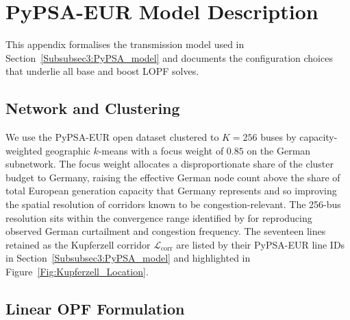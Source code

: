 \section{PyPSA-EUR Model Description}\label{Appendix:PyPSA_Model}
 
This appendix formalises the transmission model used in Section~\ref{Subsubsec3:PyPSA_model} and documents the configuration choices that underlie all base and boost LOPF solves.
 
\subsection{Network and Clustering}
 
We use the PyPSA-EUR open dataset \citep{Brown_2018_PyPSA_Eur, Frysztacki_2020_Modeling_Curtailment_Germany, Frysztacki_2021_Network_Resolution_VRE} clustered to $K = 256$ buses by capacity-weighted geographic $k$-means with a focus weight of $0.85$ on the German subnetwork. The focus weight allocates a disproportionate share of the cluster budget to Germany, raising the effective German node count above the share of total European generation capacity that Germany represents and so improving the spatial resolution of corridors known to be congestion-relevant. The 256-bus resolution sits within the convergence range identified by \citet{Frysztacki_2020_Modeling_Curtailment_Germany} for reproducing observed German curtailment and congestion frequency. The seventeen lines retained as the Kupferzell corridor $\mathcal{L}_{\mathrm{corr}}$ are listed by their PyPSA-EUR line IDs in Section~\ref{Subsubsec3:PyPSA_model} and highlighted in Figure~\ref{Fig:Kupferzell_Location}.
 
\subsection{Linear OPF Formulation}
 
